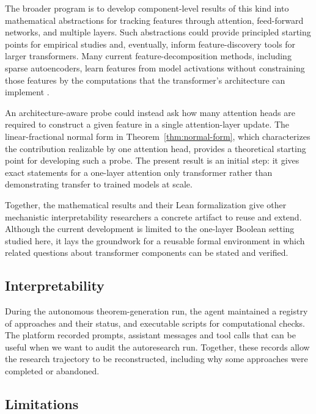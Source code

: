 \documentclass{article}
\theoremstyle{definition}
\theoremstyle{plain}
\begin{document}
The broader program is to develop component-level results of this kind into mathematical abstractions for tracking features through attention, feed-forward networks, and multiple layers. Such abstractions could provide principled starting points for empirical studies and, eventually, inform feature-discovery tools for larger transformers. Many current feature-decomposition methods, including sparse autoencoders, learn features from model activations without constraining those features by the computations that the transformer's architecture can implement \citep{cunningham2023sparseautoencodershighlyinterpretable,shafran2026from}. 

An architecture-aware probe could instead ask how many attention heads are required to construct a given feature in a single attention-layer update. The linear-fractional normal form in Theorem~\ref{thm:normal-form}, which characterizes the contribution realizable by one attention head, provides a theoretical starting point for developing such a probe. The present result is an initial step: it gives exact statements for a one-layer attention only transformer rather than demonstrating transfer to trained models at scale.

Together, the mathematical results and their Lean formalization give other mechanistic interpretability researchers a concrete artifact to reuse and extend. Although the current development is limited to the one-layer Boolean setting studied here, it lays the groundwork for a reusable formal environment in which related questions about transformer components can be stated and verified.


\subsection{Interpretability}


During the autonomous theorem-generation run, the agent maintained a registry of approaches and their status, and executable scripts for computational checks. The platform recorded prompts, assistant messages and tool calls that can be useful when we want to audit the autoresearch run. Together, these records allow the research trajectory to be reconstructed, including why some approaches were completed or abandoned.

\subsection{Limitations}
\end{document}
